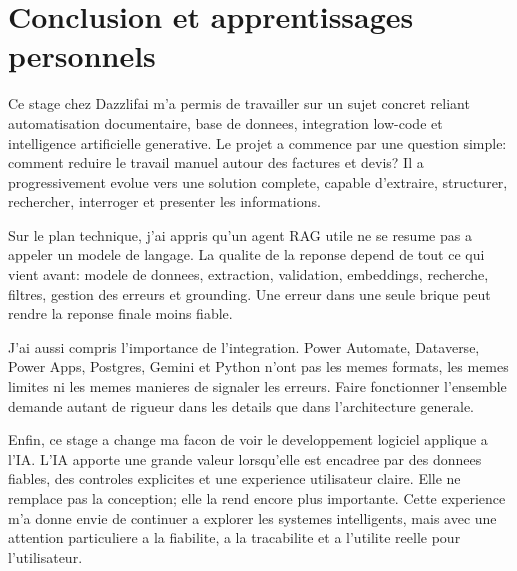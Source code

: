 \chapter*{Conclusion et apprentissages personnels}
\label{chap:conclusion}
%

Ce stage chez Dazzlifai m'a permis de travailler sur un sujet concret reliant automatisation documentaire, base de donnees, integration low-code et intelligence artificielle generative. Le projet a commence par une question simple: comment reduire le travail manuel autour des factures et devis? Il a progressivement evolue vers une solution complete, capable d'extraire, structurer, rechercher, interroger et presenter les informations.

Sur le plan technique, j'ai appris qu'un agent RAG utile ne se resume pas a appeler un modele de langage. La qualite de la reponse depend de tout ce qui vient avant: modele de donnees, extraction, validation, embeddings, recherche, filtres, gestion des erreurs et grounding. Une erreur dans une seule brique peut rendre la reponse finale moins fiable.

J'ai aussi compris l'importance de l'integration. Power Automate, Dataverse, Power Apps, Postgres, Gemini et Python n'ont pas les memes formats, les memes limites ni les memes manieres de signaler les erreurs. Faire fonctionner l'ensemble demande autant de rigueur dans les details que dans l'architecture generale.

Enfin, ce stage a change ma facon de voir le developpement logiciel applique a l'IA. L'IA apporte une grande valeur lorsqu'elle est encadree par des donnees fiables, des controles explicites et une experience utilisateur claire. Elle ne remplace pas la conception; elle la rend encore plus importante. Cette experience m'a donne envie de continuer a explorer les systemes intelligents, mais avec une attention particuliere a la fiabilite, a la tracabilite et a l'utilite reelle pour l'utilisateur.
